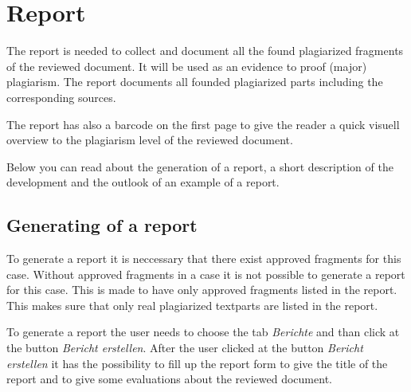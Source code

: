 







\pagebreak

\section{Report}

The report is needed to collect and document all the found plagiarized fragments of the reviewed document. It will be used as an evidence to proof (major) plagiarism.
The report documents all founded plagiarized parts including the corresponding sources.

The report has also a barcode on the first page to give the reader a quick visuell overview to the plagiarism level of the reviewed document.

Below you can read about the generation of a report, a short description of the development and the outlook of an example of a report.

\subsection{Generating of a report}

To generate a report it is neccessary that there exist approved fragments for this case. Without approved fragments in a case it is not possible to generate a report for this case. 
This is made to have only approved fragments listed in the report. This makes sure that only real plagiarized textparts are listed in the report.

To generate a report the user needs to choose the tab \textit{Berichte} and than click at the button \textit{Bericht erstellen}. After the user clicked at the  button \textit{Bericht erstellen} it has the possibility to fill up the report form to give the title of the report and to give some evaluations about the reviewed document.

